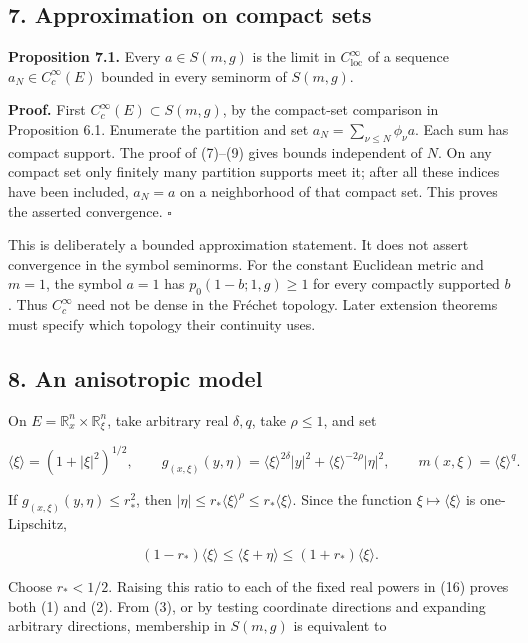 \documentclass[
  11pt,
]{article}
\begin{document}
\subsection{7. Approximation on compact
sets}\label{approximation-on-compact-sets}

\textbf{Proposition 7.1.} Every \(a\in S(m,g)\) is the limit in
\(C^\infty_{\mathrm{loc}}\) of a sequence \(a_N\in C_c^\infty(E)\)
bounded in every seminorm of \(S(m,g)\).

\textbf{Proof.} First \(C_c^\infty(E)\subset S(m,g)\), by the
compact-set comparison in Proposition 6.1. Enumerate the partition and
set \(a_N=\sum_{\nu\leq N}\phi_\nu a\). Each sum has compact support.
The proof of (7)--(9) gives bounds independent of \(N\). On any compact
set only finitely many partition supports meet it; after all these
indices have been included, \(a_N=a\) on a neighborhood of that compact
set. This proves the asserted convergence. \(\square\)

This is deliberately a bounded approximation statement. It does not
assert convergence in the symbol seminorms. For the constant Euclidean
metric and \(m=1\), the symbol \(a=1\) has \(p_0(1-b;1,g)\geq1\) for
every compactly supported \(b\). Thus \(C_c^\infty\) need not be dense
in the Fréchet topology. Later extension theorems must specify which
topology their continuity uses.

\subsection{8. An anisotropic model}\label{an-anisotropic-model}

On \(E=\mathbb R_x^n\times\mathbb R_\xi^n\), take arbitrary real
\(\delta,q\), take \(\rho\leq1\), and set

\[
\langle\xi\rangle=(1+|\xi|^2)^{1/2},\qquad
g_{(x,\xi)}(y,\eta)
=\langle\xi\rangle^{2\delta}|y|^2
+\langle\xi\rangle^{-2\rho}|\eta|^2,
\qquad m(x,\xi)=\langle\xi\rangle^q.                         \tag{16}
\]

If \(g_{(x,\xi)}(y,\eta)\leq r_*^2\), then
\(|\eta|\leq r_*\langle\xi\rangle^\rho\leq r_*\langle\xi\rangle\). Since
the function \(\xi\mapsto\langle\xi\rangle\) is one-Lipschitz,

\[
(1-r_*)\langle\xi\rangle\leq\langle\xi+\eta\rangle
\leq(1+r_*)\langle\xi\rangle.
\]

Choose \(r_*<1/2\). Raising this ratio to each of the fixed real powers
in (16) proves both (1) and (2). From (3), or by testing coordinate
directions and expanding arbitrary directions, membership in \(S(m,g)\)
is equivalent to
\end{document}
